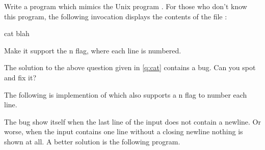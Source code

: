 \begin{Exercise}[title={Cat},difficulty=1]
\label{ex:cat}
\Question \label{ex:cat q1} Write a program which mimics the Unix program
. For those who don't know this program, the following 
invocation displays the contents of the file :
\begin{display}
\pr cat blah
\end{display}

\Question Make it support the \-n flag, where each line is
numbered.

\Question The solution to the above question given in \ref{q:cat} contains a
bug. Can you spot and fix it?
\end{Exercise}

\begin{Answer}
\Question The following is implemention of  which also 
\label{q:cat}
supports a \-n flag to number each line.

\showremarks

\Question The bug show itself when the last line of the input does not
contain a newline. Or worse, when the input contains one line without a
closing newline nothing is shown at all. A better solution is the following 
program.

\end{Answer}
